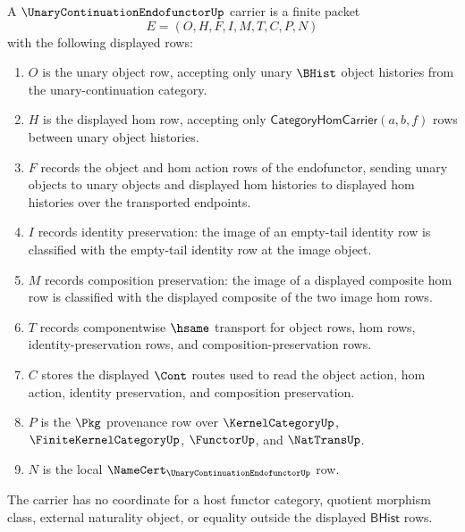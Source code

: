 \begin{definition}
\label{def:unary-continuation-endofunctor-carrier}
A $\UnaryContinuationEndofunctorUp$ carrier is a finite packet
$$
E=(O,H,F,I,M,T,C,P,N)
$$
with the following displayed rows:
\begin{enumerate}
\item $O$ is the unary object row, accepting only unary $\BHist$ object
histories from the unary-continuation category.
\item $H$ is the displayed hom row, accepting only
$\mathsf{CategoryHomCarrier}(a,b,f)$ rows between unary object histories.
\item $F$ records the object and hom action rows of the endofunctor, sending
unary objects to unary objects and displayed hom histories to displayed hom
histories over the transported endpoints.
\item $I$ records identity preservation: the image of an empty-tail identity
row is classified with the empty-tail identity row at the image object.
\item $M$ records composition preservation: the image of a displayed composite
hom row is classified with the displayed composite of the two image hom rows.
\item $T$ records componentwise $\hsame$ transport for object rows, hom rows,
identity-preservation rows, and composition-preservation rows.
\item $C$ stores the displayed $\Cont$ routes used to read the object action,
hom action, identity preservation, and composition preservation.
\item $P$ is the $\Pkg$ provenance row over $\KernelCategoryUp$,
$\FiniteKernelCategoryUp$, $\FunctorUp$, and $\NatTransUp$.
\item $N$ is the local $\NameCert_{\UnaryContinuationEndofunctorUp}$ row.
\end{enumerate}
The carrier has no coordinate for a host functor category, quotient morphism
class, external naturality object, or equality outside the displayed
$\mathsf{BHist}$ rows.
\end{definition}

